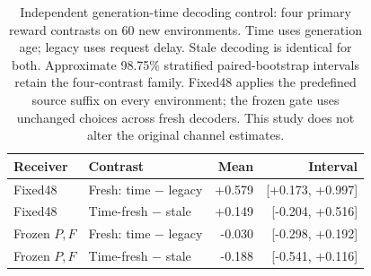 \documentclass[10pt,a4paper]{article}
\begin{document}
\setcounter{table}{7}
\begin{table}[H]\centering\small
\caption{Independent generation-time decoding control: four primary reward contrasts on 60 new environments. Time uses generation age; legacy uses request delay. Stale decoding is identical for both. Approximate 98.75\% stratified paired-bootstrap intervals retain the four-contrast family. Fixed48 applies the predefined source suffix on every environment; the frozen gate uses unchanged choices across fresh decoders. This study does not alter the original channel estimates.}
\setlength{\tabcolsep}{3pt}\begin{tabular}{llrr}\toprule Receiver & Contrast & Mean & Interval\\\midrule
Fixed48 & Fresh: time $-$ legacy & +0.579 & [+0.173, +0.997]\\
Fixed48 & Time-fresh $-$ stale & +0.149 & [-0.204, +0.516]\\
Frozen $P,F$ & Fresh: time $-$ legacy & -0.030 & [-0.298, +0.192]\\
Frozen $P,F$ & Time-fresh $-$ stale & -0.188 & [-0.541, +0.116]\\
\bottomrule\end{tabular}\end{table}
\end{document}
